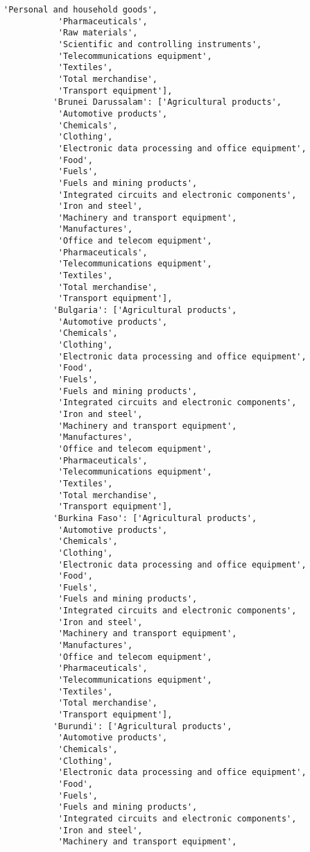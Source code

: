\documentclass[11pt]{article}
\begin{document}
\begin{Verbatim}[commandchars=\\\{\}]
           'Personal and household goods',
           'Pharmaceuticals',
           'Raw materials',
           'Scientific and controlling instruments',
           'Telecommunications equipment',
           'Textiles',
           'Total merchandise',
           'Transport equipment'],
          'Brunei Darussalam': ['Agricultural products',
           'Automotive products',
           'Chemicals',
           'Clothing',
           'Electronic data processing and office equipment',
           'Food',
           'Fuels',
           'Fuels and mining products',
           'Integrated circuits and electronic components',
           'Iron and steel',
           'Machinery and transport equipment',
           'Manufactures',
           'Office and telecom equipment',
           'Pharmaceuticals',
           'Telecommunications equipment',
           'Textiles',
           'Total merchandise',
           'Transport equipment'],
          'Bulgaria': ['Agricultural products',
           'Automotive products',
           'Chemicals',
           'Clothing',
           'Electronic data processing and office equipment',
           'Food',
           'Fuels',
           'Fuels and mining products',
           'Integrated circuits and electronic components',
           'Iron and steel',
           'Machinery and transport equipment',
           'Manufactures',
           'Office and telecom equipment',
           'Pharmaceuticals',
           'Telecommunications equipment',
           'Textiles',
           'Total merchandise',
           'Transport equipment'],
          'Burkina Faso': ['Agricultural products',
           'Automotive products',
           'Chemicals',
           'Clothing',
           'Electronic data processing and office equipment',
           'Food',
           'Fuels',
           'Fuels and mining products',
           'Integrated circuits and electronic components',
           'Iron and steel',
           'Machinery and transport equipment',
           'Manufactures',
           'Office and telecom equipment',
           'Pharmaceuticals',
           'Telecommunications equipment',
           'Textiles',
           'Total merchandise',
           'Transport equipment'],
          'Burundi': ['Agricultural products',
           'Automotive products',
           'Chemicals',
           'Clothing',
           'Electronic data processing and office equipment',
           'Food',
           'Fuels',
           'Fuels and mining products',
           'Integrated circuits and electronic components',
           'Iron and steel',
           'Machinery and transport equipment',

\end{Verbatim}
\end{document}
